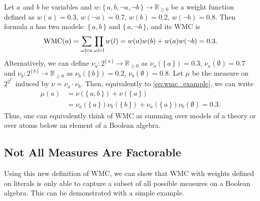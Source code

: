\begin{example}
  Let $a$ and $b$ be variables and
  $w\colon \{\, a, b, \neg a, \neg b \,\} \to \mathbb{R}_{\ge 0}$ be a weight
  function defined as $w(a) = 0.3$, $w(\neg a) = 0.7$, $w(b) = 0.2$,
  $w(\neg b) = 0.8$. Then formula $a$ has two models: $\{\, a, b \,\}$ and
  $\{\, a, \neg b \,\}$, and its WMC is
  \begin{equation} \label{eq:wmc_example}
    \operatorname{WMC}(a) = \sum_{\omega \models a} \prod_{\omega \models l} w(l) = w(a)w(b) + w(a)w(\neg b) = 0.3.
  \end{equation}
  Alternatively, we can define
  $\nu_a\colon 2^{\{\, a \,\}} \to \mathbb{R}_{\ge 0}$ as
  $\nu_a(\{\, a \,\}) = 0.3$, $\nu_a(\emptyset) = 0.7$ and
  $\nu_b\colon 2^{\{\, b \,\}} \to \mathbb{R}_{\ge 0}$ as
  $\nu_b(\{\, b \,\}) = 0.2$, $\nu_b(\emptyset) = 0.8$. Let $\mu$ be the measure
  on $2^{2^U}$ induced by $\nu = \nu_a \cdot \nu_b$. Then, equivalently to
  \cref{eq:wmc_example}, we can write
  \begin{align*}
    \mu(a) &= \nu(\{\, a, b \,\}) + \nu(\{\, a \,\}) \\
           &= \nu_a(\{\, a \,\})\nu_b(\{\, b \,\}) + \nu_a(\{\, a \,\})\nu_b(\emptyset) = 0.3.
  \end{align*}
  Thus, one can equivalently think of WMC as summing over models of a theory or
  over atoms below an element of a Boolean algebra.
\end{example}

\subsection{Not All Measures Are Factorable}

Using this new definition of WMC, we can show that WMC with weights defined on
literals is only able to capture a subset of all possible measures on a
Boolean algebra. This can be demonstrated with a simple example.

